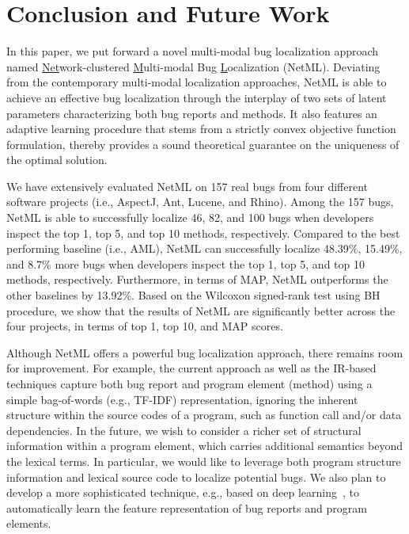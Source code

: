 \section{Conclusion and Future Work}
\label{sec.conclusion}

In this paper, we put forward a novel multi-modal bug localization approach  named \underline{Net}work-clustered \underline{M}ulti-modal Bug \underline{L}ocalization (NetML). Deviating from the contemporary multi-modal localization approaches, NetML is able to achieve an effective bug localization through the interplay of two sets of latent parameters characterizing both bug reports and methods. It also features an adaptive learning procedure that stems from a strictly convex objective function formulation, thereby provides a sound theoretical guarantee on the uniqueness of the optimal solution.

We have extensively evaluated NetML on 157 real bugs from four different software projects (i.e., AspectJ, Ant, Lucene, and Rhino). Among the 157 bugs, NetML is able to successfully localize 46, 82, and 100 bugs when developers inspect the top 1, top 5, and top 10 methods, respectively. Compared to the best performing baseline (i.e., AML), NetML can successfully localize 48.39\%, 15.49\%, and 8.7\% more bugs when developers inspect the top 1, top 5, and top 10 methods, respectively. Furthermore, in terms of MAP, NetML outperforms the other baselines by 13.92\%. Based on the Wilcoxon signed-rank test using BH procedure, we show that the results of NetML are significantly better across the four projects, in terms of top 1, top 10, and MAP scores.

Although NetML offers a powerful bug localization approach, there remains room for improvement. For example, the current approach as well as the IR-based techniques capture both bug report and program element (method) using a simple bag-of-words (e.g., TF-IDF) representation, ignoring the inherent structure within the source codes of a program, such as function call and/or data dependencies. 
In the future, we wish to consider a richer set of structural information within a program element, which carries additional semantics beyond the lexical terms. In particular, we would like to leverage both program structure information and lexical source code to localize potential bugs. We also plan to develop a more sophisticated technique, e.g., based on deep learning~\cite{Goodfellow2016}, to automatically learn the feature representation of bug reports and program elements.

